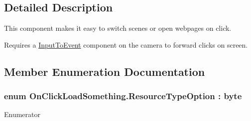 \subsection{Detailed Description}
This component makes it easy to switch scenes or open webpages on click. 

Requires a \hyperlink{class_input_to_event}{Input\+To\+Event} component on the camera to forward clicks on screen. 

\subsection{Member Enumeration Documentation}
\subsubsection[{\texorpdfstring{Resource\+Type\+Option}{ResourceTypeOption}}]{\setlength{\rightskip}{0pt plus 5cm}enum {\bf On\+Click\+Load\+Something.\+Resource\+Type\+Option} \+: byte\hspace{0.3cm}{\ttfamily [strong]}}\hypertarget{class_on_click_load_something_a43b622b02426c42ad0c1f841dcaef1ba}{}\label{class_on_click_load_something_a43b622b02426c42ad0c1f841dcaef1ba}
\begin{Desc}
\item[Enumerator]\par
\begin{description}
\item[{\em 
Scene\hypertarget{class_on_click_load_something_a43b622b02426c42ad0c1f841dcaef1baa9ead0d38e06ec253ca0ecbf6ea56e59b}{}\label{class_on_click_load_something_a43b622b02426c42ad0c1f841dcaef1baa9ead0d38e06ec253ca0ecbf6ea56e59b}
}]\item[{\em 
Web\hypertarget{class_on_click_load_something_a43b622b02426c42ad0c1f841dcaef1baac6e190b284633c48e39e55049da3cce8}{}\label{class_on_click_load_something_a43b622b02426c42ad0c1f841dcaef1baac6e190b284633c48e39e55049da3cce8}
}]\end{description}
\end{Desc}



